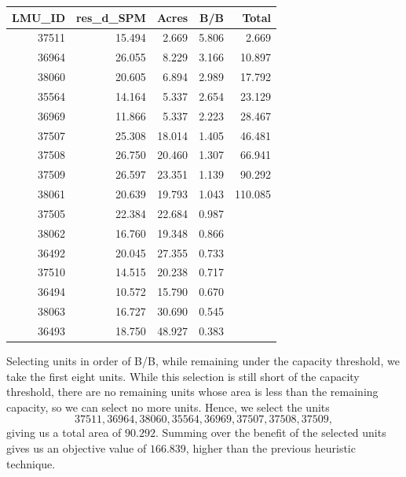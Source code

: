 \documentclass[12pt]{article}
\theoremstyle{definition}
\begin{document}
\begin{center}
    \begin{tabular}{r|r|r|r|r}
        LMU\_ID & res\_d\_SPM & Acres  & B/B   & Total   \\
        \hline
        37511  & 15.494    & 2.669  & 5.806 & 2.669   \\
        36964  & 26.055    & 8.229  & 3.166 & 10.897  \\
        38060  & 20.605    & 6.894  & 2.989 & 17.792  \\
        35564  & 14.164    & 5.337  & 2.654 & 23.129  \\
        36969  & 11.866    & 5.337  & 2.223 & 28.467  \\
        37507  & 25.308    & 18.014 & 1.405 & 46.481  \\
        37508  & 26.750    & 20.460 & 1.307 & 66.941  \\
        37509  & 26.597    & 23.351 & 1.139 & 90.292  \\
        38061  & 20.639    & 19.793 & 1.043 & 110.085 \\
        37505  & 22.384    & 22.684 & 0.987 &         \\
        38062  & 16.760    & 19.348 & 0.866 &         \\
        36492  & 20.045    & 27.355 & 0.733 &         \\
        37510  & 14.515    & 20.238 & 0.717 &         \\
        36494  & 10.572    & 15.790 & 0.670 &         \\
        38063  & 16.727    & 30.690 & 0.545 &         \\
        36493  & 18.750    & 48.927 & 0.383 &        
        \end{tabular}
\end{center}

Selecting units in order of B/B, while remaining under the capacity threshold, we take the first eight units. While this selection is still short of the capacity threshold, there are no remaining units whose area is less than the remaining capacity, so we can select no more units. Hence, we select the units
\[
    37511, 36964, 38060, 35564, 36969, 37507, 37508, 37509,
\]
giving us a total area of $90.292$. Summing over the benefit of the selected units gives us an objective value of $166.839$, higher than the previous heuristic technique.
\end{document}
